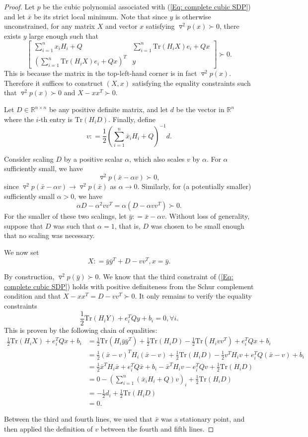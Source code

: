 \documentclass[11pt]{article}
\theoremstyle{plain}
\theoremstyle{definition}
\theoremstyle{remark}
\def \bmat{\left[\begin{matrix}}
\def \emat{\end{matrix}\right]}
\def \defeq{\mathrel{\mathop{:}}=}
\def \Tr{\mathrm{Tr}}
\def \xbar{\bar{x}}
\def \ybar{\bar{y}}
\def \Hess{\triangledown^2}
\def \R{\mathbb{R}}
\def \Rn{\R^n}
\begin{document}
\begin{proof}
Let $p$ be the cubic polynomial associated with (\ref{Eq: complete cubic SDP}) and let $\xbar$ be its strict local minimum. Note that since $y$ is otherwise unconstrained, for any matrix $X$ and vector $x$ satisfying $\Hess p(x) \succ 0$, there exists $y$ large enough such that $$\bmat \sum_{i=1}^n x_iH_i + Q & \sum_{i=1}^n \Tr(H_iX)e_i+Qx \\ (\sum_{i=1}^n \Tr(H_iX)e_i+Qx)^T & y\emat \succ 0.$$ This is because the matrix in the top-left-hand corner is in fact $\Hess p(x)$. Therefore it suffices to construct $(X,x)$ satisfying the equality constraints such that $\Hess p(x) \succ 0$ and $X - xx^T \succ 0$.

Let $D \in \R^{n \times n}$ be any positive definite matrix, and let $d$ be the vector in $\Rn$ where the $i$-th entry is $\Tr(H_iD)$. Finally, define $$v \defeq \frac{1}{2}(\sum_{i=1}^n \xbar_iH_i + Q)^{-1}d.$$

Consider scaling $D$ by a positive scalar $\alpha$, which also scales $v$ by $\alpha$. For $\alpha$ sufficiently small, we have
$$\Hess p(\xbar - \alpha v) \succ 0,$$
since $\Hess p(\xbar - \alpha v) \to \Hess p(\xbar)$ as $\alpha \to 0$. Similarly, for (a potentially smaller) sufficiently small $\alpha > 0$, we have
$$\alpha D - \alpha^2 vv^T = \alpha (D - \alpha vv^T) \succ 0.$$
For the smaller of these two scalings, let $\ybar \defeq \xbar - \alpha v$. Without loss of generality, suppose that $D$ was such that $\alpha = 1$, that is, $D$ was chosen to be small enough that no scaling was necessary.

We now set
$$X \defeq \ybar\ybar^T + D - vv^T, x = \ybar.$$

By construction, $\Hess p(\ybar) \succ 0$. We know that the third constraint of (\ref{Eq: complete cubic SDP}) holds with positive definiteness from the Schur complement condition and that $X - xx^T = D - vv^T \succ 0$. It only remains to verify the equality constraints
$$\frac{1}{2}\Tr(H_iY) + e_i^TQy + b_i = 0, \forall i.$$
 This is proven by the following chain of equalities:
\begin{align*}
    \frac{1}{2}\Tr(H_iX) + e_i^TQx + b_i &= \frac{1}{2} \Tr(H_i\ybar\ybar^T) + \frac{1}{2}\Tr(H_iD) - \frac{1}{2}\Tr(H_ivv^T) + e_i^TQx + b_i\\
    &= \frac{1}{2}(\xbar - v)^TH_i(\xbar - v) + \frac{1}{2}\Tr(H_iD) - \frac{1}{2}v^TH_iv + e_i^TQ(\xbar - v) + b_i\\
    &=\frac{1}{2}\xbar^TH_i\xbar + e_i^TQ\xbar + b_i - \xbar^TH_iv - e_i^TQv + \frac{1}{2}\Tr(H_iD)\\
    &= 0 -\left(\sum_{i=1}^n (\xbar_iH_i + Q)v\right)_i + \frac{1}{2}\Tr(H_iD)\\
    &= -\frac{1}{2}d_i + \frac{1}{2}\Tr(H_iD)\\
    &= 0.
\end{align*}

Between the third and fourth lines, we used that $\xbar$ was a stationary point, and then applied the definition of $v$ between the fourth and fifth lines.

\end{proof}
\end{document}

